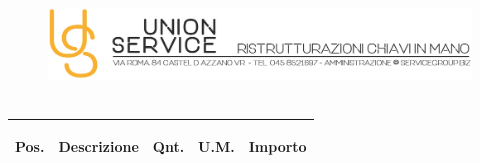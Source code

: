 \documentclass[a4paper]{article}
\begin{document}
                                 \begin{figure}[!t]
                                 \includegraphics[width=15.8cm, height=3cm]{intestazioneAlta2.jpg}
                                 \end{figure}
                                
                                  \noindent\begin{tabular}{ | L{10mm} |  L{86mm} | L{12mm} | L{12mm} | L{16mm} | }
                                  \hline
                                \vspace{2.5mm}\begin{spacing}{0}\textbf{Pos.}\end{spacing} &\vspace{2.5mm}\begin{spacing}{0}\textbf{Descrizione}\end{spacing} &\vspace{2.5mm}\begin{spacing}{0}\textbf{Qnt.}\end{spacing} &\vspace{2.5mm}\begin{spacing}{0}\textbf{U.M.}\end{spacing} &\vspace{2.5mm}\begin{spacing}{0}\textbf{Importo}
                        \end{spacing} \\ \hline %


\end{tabular}
\end{document}
